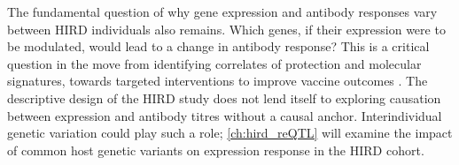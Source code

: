 The fundamental question of why gene expression and antibody responses vary between \gls{HIRD} individuals also remains.
Which genes, if their expression were to be modulated, would lead to a change in antibody response?
This is a critical question in the move from identifying correlates of protection and molecular signatures, towards targeted interventions to improve vaccine outcomes \autocite{tsang2020ImprovingVaccineinducedImmunity}.
The descriptive design of the \gls{HIRD} study does not lend itself to exploring causation between expression and antibody titres without a causal anchor.
Interindividual genetic variation could play such a role; \cref{ch:hird_reQTL} will examine the impact of common host genetic variants on expression response in the \gls{HIRD} cohort.

%

%
%

